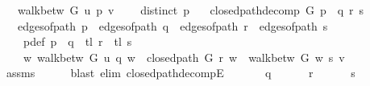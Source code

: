 \begin{isabellebody}
\ \ \ {\isachardoublequoteopen}walk{\isacharunderscore}{\kern0pt}betw\ G\ u\ p\ v{\isachardoublequoteclose}\isanewline
\ \ \ {\isachardoublequoteopen}{\isasymnot}\ distinct\ p{\isachardoublequoteclose}\isanewline
\ \ \ {\isachardoublequoteopen}closed{\isacharunderscore}{\kern0pt}path{\isacharunderscore}{\kern0pt}decomp\ G\ p\ {\isacharequal}{\kern0pt}\ {\isacharparenleft}{\kern0pt}q{\isacharcomma}{\kern0pt}\ r{\isacharcomma}{\kern0pt}\ s{\isacharparenright}{\kern0pt}{\isachardoublequoteclose}\isanewline
\ \ \ {\isachardoublequoteopen}edges{\isacharunderscore}{\kern0pt}of{\isacharunderscore}{\kern0pt}path\ p\ {\isacharequal}{\kern0pt}\ edges{\isacharunderscore}{\kern0pt}of{\isacharunderscore}{\kern0pt}path\ q\ {\isacharat}{\kern0pt}\ edges{\isacharunderscore}{\kern0pt}of{\isacharunderscore}{\kern0pt}path\ r\ {\isacharat}{\kern0pt}\ edges{\isacharunderscore}{\kern0pt}of{\isacharunderscore}{\kern0pt}path\ s{\isachardoublequoteclose}%
\endisataginvisible
{\isafoldinvisible}%
%
\isadeliminvisible
\isanewline
%
\endisadeliminvisible
%
\isadelimproof
%
\endisadelimproof
%
\isatagproof
{}\isamarkupfalse%
\ {\isacharminus}{\kern0pt}\isanewline
\ \ \isamarkupfalse%
\isanewline
\ \ \ \ p{\isacharunderscore}{\kern0pt}def{\isacharcolon}{\kern0pt}\ {\isachardoublequoteopen}p\ {\isacharequal}{\kern0pt}\ q\ {\isacharat}{\kern0pt}\ tl\ r\ {\isacharat}{\kern0pt}\ tl\ s{\isachardoublequoteclose}\ \isanewline
\ \ \ \ {\isachardoublequoteopen}{\isasymexists}w{\isachardot}{\kern0pt}\ walk{\isacharunderscore}{\kern0pt}betw\ G\ u\ q\ w\ {\isasymand}\ closed{\isacharunderscore}{\kern0pt}path\ G\ r\ w\ {\isasymand}\ walk{\isacharunderscore}{\kern0pt}betw\ G\ w\ s\ v{\isachardoublequoteclose}\isanewline
\ \ \ \ \isamarkupfalse%
\ assms\isanewline
\ \ \ \ \isamarkupfalse%
\ {\isacharparenleft}{\kern0pt}blast\ elim{\isacharcolon}{\kern0pt}\ closed{\isacharunderscore}{\kern0pt}path{\isacharunderscore}{\kern0pt}decompE{\isacharunderscore}{\kern0pt}{}{\isacharparenright}{\kern0pt}{\isacharplus}{\kern0pt}\isanewline
\ \ \isamarkupfalse%
\isanewline
\ \ \ \ {\isachardoublequoteopen}q\ {\isasymnoteq}\ {\isacharbrackleft}{\kern0pt}{\isacharbrackright}{\kern0pt}{\isachardoublequoteclose}\isanewline
\ \ \ \ {\isachardoublequoteopen}r\ {\isasymnoteq}\ {\isacharbrackleft}{\kern0pt}{\isacharbrackright}{\kern0pt}{\isachardoublequoteclose}\isanewline
\ \ \ \ {\isachardoublequoteopen}s\ {\isasymnoteq}\ {\isacharbrackleft}{\kern0pt}{\isacharbrackright}{\kern0pt}{\isachardoublequoteclose}\isanewline

\end{isabellebody}
